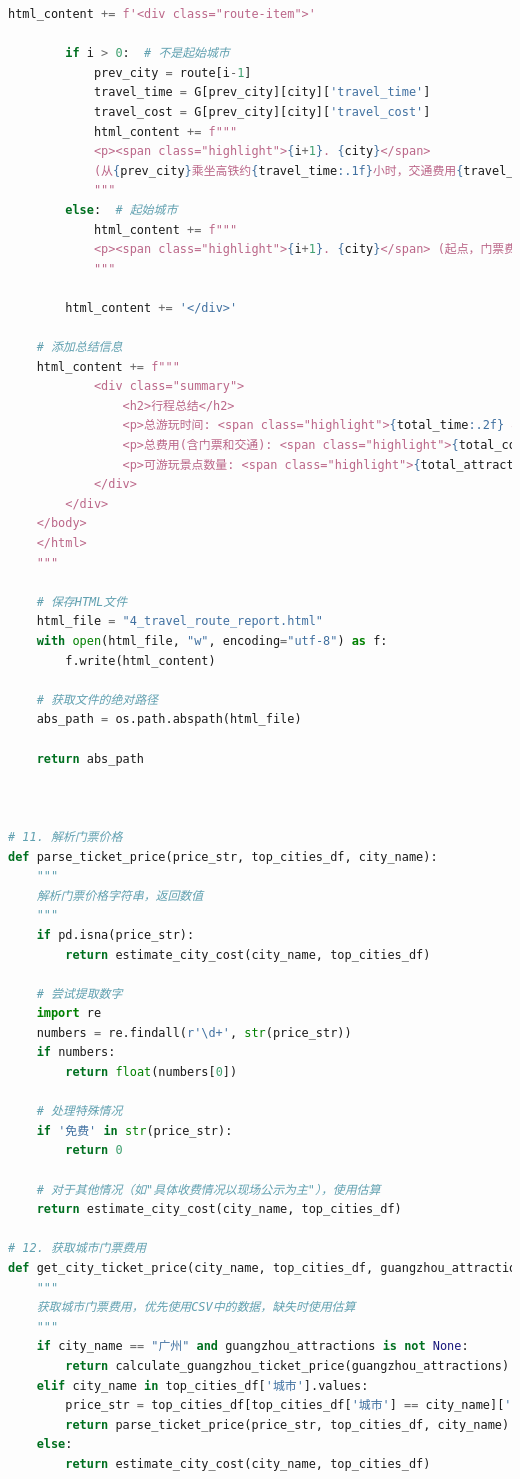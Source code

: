 \documentclass[withoutpreface,bwprint]{cumcmthesis} %
\begin{document}
\begin{appendices}
\begin{lstlisting}[language=python]
        html_content += f'<div class="route-item">'
        
        if i > 0:  # 不是起始城市
            prev_city = route[i-1]
            travel_time = G[prev_city][city]['travel_time']
            travel_cost = G[prev_city][city]['travel_cost']
            html_content += f"""
            <p><span class="highlight">{i+1}. {city}</span> 
            (从{prev_city}乘坐高铁约{travel_time:.1f}小时，交通费用{travel_cost:.0f}元，门票费用约{city_cost:.0f}元，可游览{attractions}个景点)</p>
            """
        else:  # 起始城市
            html_content += f"""
            <p><span class="highlight">{i+1}. {city}</span> (起点，门票费用约{city_cost:.0f}元，可游览{attractions}个景点)</p>
            """
        
        html_content += '</div>'
    
    # 添加总结信息
    html_content += f"""
            <div class="summary">
                <h2>行程总结</h2>
                <p>总游玩时间: <span class="highlight">{total_time:.2f} 小时</span></p>
                <p>总费用(含门票和交通): <span class="highlight">{total_cost:.2f} 元</span></p>
                <p>可游玩景点数量: <span class="highlight">{total_attractions}</span></p>
            </div>
        </div>
    </body>
    </html>
    """
    
    # 保存HTML文件
    html_file = "4_travel_route_report.html"
    with open(html_file, "w", encoding="utf-8") as f:
        f.write(html_content)
    
    # 获取文件的绝对路径
    abs_path = os.path.abspath(html_file)
    
    return abs_path



# 11. 解析门票价格
def parse_ticket_price(price_str, top_cities_df, city_name):
    """
    解析门票价格字符串，返回数值
    """
    if pd.isna(price_str):
        return estimate_city_cost(city_name, top_cities_df)
    
    # 尝试提取数字
    import re
    numbers = re.findall(r'\d+', str(price_str))
    if numbers:
        return float(numbers[0])
    
    # 处理特殊情况
    if '免费' in str(price_str):
        return 0
    
    # 对于其他情况（如"具体收费情况以现场公示为主"），使用估算
    return estimate_city_cost(city_name, top_cities_df)

# 12. 获取城市门票费用
def get_city_ticket_price(city_name, top_cities_df, guangzhou_attractions=None):
    """
    获取城市门票费用，优先使用CSV中的数据，缺失时使用估算
    """
    if city_name == "广州" and guangzhou_attractions is not None:
        return calculate_guangzhou_ticket_price(guangzhou_attractions)
    elif city_name in top_cities_df['城市'].values:
        price_str = top_cities_df[top_cities_df['城市'] == city_name]['门票'].values[0]
        return parse_ticket_price(price_str, top_cities_df, city_name)
    else:
        return estimate_city_cost(city_name, top_cities_df)
    

\end{lstlisting}
\end{appendices}
\end{document}
